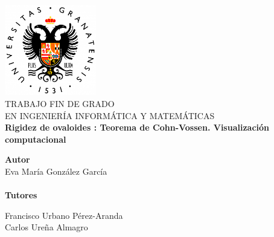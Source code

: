 \begin{titlepage}
 
 
\newlength{\centeroffset}
\setlength{\centeroffset}{-0.5\oddsidemargin}
\addtolength{\centeroffset}{0.5\evensidemargin}
\thispagestyle{empty}

\noindent\hspace*{\centeroffset}\begin{minipage}{\textwidth}

\centering
\includegraphics[width=0.3\textwidth]{imagenes/logougr_new.png}\\[1.4cm]

\textsc{ \Large TRABAJO FIN DE GRADO\\[0.2cm]}
\textsc{ EN INGENIERÍA INFORMÁTICA Y MATEMÁTICAS }\\[1cm]

% 
{\Huge\bfseries Rigidez de ovaloides : Teorema de Cohn-Vossen. Visualización computacional\\
}
\end{minipage}

\vspace{2.5cm}
\noindent\hspace*{\centeroffset}\begin{minipage}{\textwidth}
\centering

\textbf{Autor}\\ {Eva María González García}\\[2.5ex]
${ }$\\
\textbf{Tutores}\\
\begin{multicols}{2}
		Francisco Urbano Pérez-Aranda\\
		\columnbreak
Carlos Ureña Almagro
\end{multicols}%

${ }$\\
\begin{multicols}{2}%
           

\end{multicols}
\end{minipage}
\end{titlepage}

